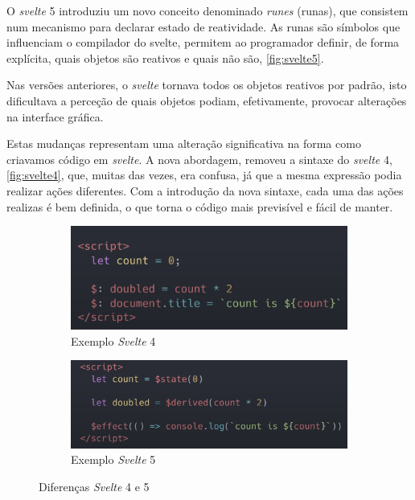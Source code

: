 O \textit{svelte} 5 introduziu um novo conceito denominado \textit{runes} (runas), que consistem num mecanismo para declarar estado de reatividade. As runas são símbolos que influenciam o compilador do svelte, permitem ao programador definir, de forma explícita, quais objetos são reativos e quais não são, \autoref{fig:svelte5}. 

Nas versões anteriores, o \textit{svelte} tornava todos os objetos reativos por padrão, isto dificultava a perceção de quais objetos podiam, efetivamente, provocar alterações na interface gráfica.

Estas mudanças representam uma alteração significativa na forma como criavamos código em \textit{svelte}. A nova abordagem, removeu a sintaxe do \textit{svelte} 4, \autoref{fig:svelte4}, que, muitas das vezes, era confusa, já que a mesma expressão podia realizar ações diferentes. Com a introdução da nova sintaxe, cada uma das ações realizas é bem definida, o que torna o código mais previsível e fácil de manter. 

\begin{figure}[!h]
	\centering
	\begin{subfigure}[c]{0.45\textwidth}
		\centering
		\includegraphics[width=\textwidth]{figs/svelte4.png}
		\caption{Exemplo \textit{Svelte} 4}
		\label{fig:svelte4}
	\end{subfigure}
	\hfill
	\begin{subfigure}[c]{0.45\textwidth}
		\centering
		\includegraphics[width=\textwidth]{figs/svelte5.png}
		\caption{Exemplo \textit{Svelte} 5}
		\label{fig:svelte5}
	\end{subfigure}
	\caption{Diferenças \textit{Svelte} 4 e 5}
\end{figure}

